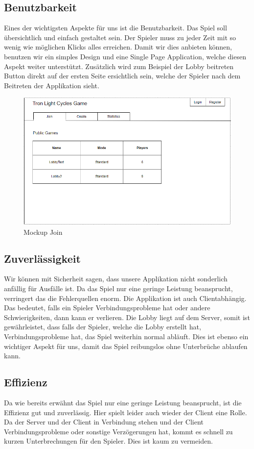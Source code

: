 \documentclass[11pt,ngerman]{article}
\begin{document}
	\subsection{Benutzbarkeit}
	Eines der wichtigsten Aspekte für uns ist die Benutzbarkeit. Das Spiel soll übersichtlich und einfach gestaltet sein. Der Spieler muss zu jeder Zeit mit so wenig wie möglichen Klicks alles erreichen. Damit wir dies anbieten können, benutzen wir ein simples Design und eine Single Page Application, welche diesen Aspekt weiter unterstützt. Zusätzlich wird zum Beispiel der Lobby beitreten Button direkt auf der ersten Seite ersichtlich sein, welche der Spieler nach dem Beitreten der Applikation sieht.
	\begin{figure}[H]
		\centering
		\includegraphics[scale=0.6]{figures/Mockup_Join.png}
		\caption{Mockup Join}
		\label{fig:MockupJoin}
	\end{figure}
    \subsection{Zuverlässigkeit}
	Wir können mit Sicherheit sagen, dass unsere Applikation nicht sonderlich anfällig für Ausfälle ist. Da das Spiel nur eine geringe Leistung beansprucht, verringert das die Fehlerquellen enorm. Die Applikation ist auch Clientabhängig. Das bedeutet, falls ein Spieler Verbindungsprobleme hat oder andere Schwierigkeiten, dann kann er verlieren. Die Lobby liegt auf dem Server, somit ist gewährleistet, dass falls der Spieler, welche die Lobby erstellt hat, Verbindungsprobleme hat, das Spiel weiterhin normal abläuft. Dies ist ebenso ein wichtiger Aspekt für uns, damit das Spiel reibungslos ohne Unterbrüche ablaufen kann.
    \subsection{Effizienz}
	Da wie bereits erwähnt das Spiel nur eine geringe Leistung beansprucht, ist die Effizienz gut und zuverlässig. Hier spielt leider auch wieder der Client eine Rolle. Da der Server und der Client in Verbindung stehen und der Client Verbindungsprobleme oder sonstige Verzögerungen hat, kommt es schnell zu kurzen Unterbrechungen für den Spieler. Dies ist kaum zu vermeiden.
\end{document}
